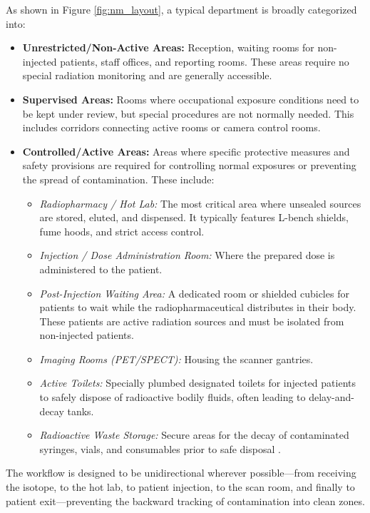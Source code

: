 As shown in Figure \ref{fig:nm_layout}, a typical department is broadly categorized into:
\begin{itemize}
    \item \textbf{Unrestricted/Non-Active Areas:} Reception, waiting rooms for non-injected patients, staff offices, and reporting rooms. These areas require no special radiation monitoring and are generally accessible.
    \item \textbf{Supervised Areas:} Rooms where occupational exposure conditions need to be kept under review, but special procedures are not normally needed. This includes corridors connecting active rooms or camera control rooms.
    \item \textbf{Controlled/Active Areas:} Areas where specific protective measures and safety provisions are required for controlling normal exposures or preventing the spread of contamination. These include:
    \begin{itemize}
        \item \textit{Radiopharmacy / Hot Lab:} The most critical area where unsealed sources are stored, eluted, and dispensed. It typically features L-bench shields, fume hoods, and strict access control.
        \item \textit{Injection / Dose Administration Room:} Where the prepared dose is administered to the patient.
        \item \textit{Post-Injection Waiting Area:} A dedicated room or shielded cubicles for patients to wait while the radiopharmaceutical distributes in their body. These patients are active radiation sources and must be isolated from non-injected patients.
        \item \textit{Imaging Rooms (PET/SPECT):} Housing the scanner gantries.
        \item \textit{Active Toilets:} Specially plumbed designated toilets for injected patients to safely dispose of radioactive bodily fluids, often leading to delay-and-decay tanks.
        \item \textit{Radioactive Waste Storage:} Secure areas for the decay of contaminated syringes, vials, and consumables prior to safe disposal \cite{aerb_publications}.
    \end{itemize}
\end{itemize}

The workflow is designed to be unidirectional wherever possible—from receiving the isotope, to the hot lab, to patient injection, to the scan room, and finally to patient exit—preventing the backward tracking of contamination into clean zones.

